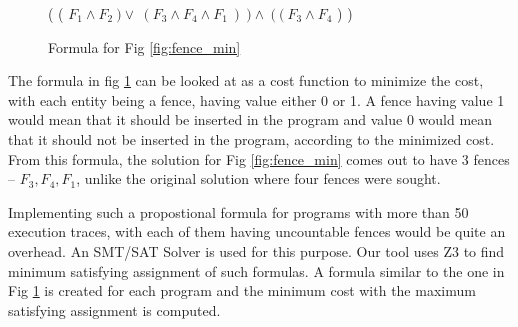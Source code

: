 \begin{figure}
\begin{center}
	( ( $F_1 \land F_2\ ) \lor\ ( F_3 \land F_4 \land F_1\ )\ ) \land\ (\ (\ F_3 \land F_4$ ) )
	\caption{Formula for Fig \ref{fig:fence_min}}
	\label{fig:fence_form}
\end{center}
\end{figure}

\par
The formula in fig \ref{fig:fence_form} can be looked at as a 
cost function to minimize the cost, with each entity being a fence, 
having value either 0 or 1. A fence having value 1 would mean that 
it should be inserted in the program and value 0 would mean that 
it should not be inserted in the program, according to the 
minimized cost. From this formula, the solution for Fig \ref{fig:fence_min} 
comes out to have 3 fences – \textit{$F_3, F_4, F_1$}, 
unlike the original solution where four fences were sought.

\par
Implementing such a propostional formula for programs with 
more than 50 execution traces, with each of them having uncountable 
fences would be quite an overhead. An SMT/SAT Solver is used for 
this purpose. Our tool uses Z3 to find minimum satisfying assignment 
of such formulas. A formula similar to the one in Fig \ref{fig:fence_form} 
is created for each program and the minimum cost with the maximum 
satisfying assignment is computed. 




